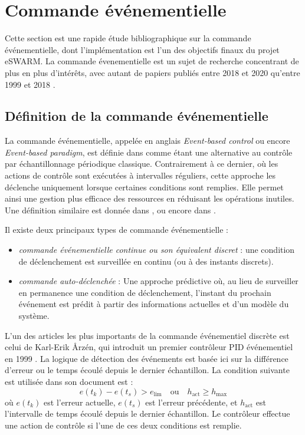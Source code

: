 \newpage

\section{Commande événementielle}
\label{cmd_ev}
Cette section est une rapide étude bibliographique sur la commande événementielle, dont l'implémentation est l'un des objectifs finaux du projet eSWARM. La commande évenementielle est un sujet de recherche concentrant de plus en plus d'intérêts, avec autant de papiers publiés entre 2018 et 2020 qu'entre 1999 et 2018 \cite{aranda-escolastico_event-based_2020}.

\subsection{Définition de la commande événementielle}

La commande événementielle, appelée en anglais \textit{Event-based control} ou encore \textit{Event-based paradigm}, est définie dans \cite{astrom_event_2008} comme étant une alternative au contrôle par échantillonnage périodique classique. Contrairement à ce dernier, où les actions de contrôle sont exécutées à intervalles réguliers, cette approche les déclenche uniquement lorsque certaines conditions sont remplies. Elle permet ainsi une gestion plus efficace des ressources en réduisant les opérations inutiles. Une définition similaire est donnée dans \cite{durand_event-based_2015}, ou encore dans \cite{heemels_introduction_2012}.

\noindent Il existe deux principaux types de commande événementielle \cite{aranda-escolastico_event-based_2020} : 
\begin{itemize}
    \item \textit{commande événementielle continue ou son équivalent discret} : une condition de déclenchement est surveillée en continu (ou à des instants discrets). 
    \item \textit{commande auto-déclenchée} : Une approche prédictive où, au lieu de surveiller en permanence une condition de déclenchement, l'instant du prochain événement est prédit à partir des informations actuelles et d'un modèle du système.
\end{itemize}

L'un des articles les plus importants de la commande événementiel discrète est celui de  Karl-Erik Årzén, qui introduit un premier contrôleur PID événementiel en 1999 \cite{aarzen_simple_1999}. La logique de détection des événements est basée ici sur la différence d'erreur ou le temps écoulé depuis le dernier échantillon. La condition suivante est utilisée dans son document est :
\[
  e(t_k) - e(t_s) > e_{\text{lim}} \quad \text{ou} \quad h_{\text{act}} \geq h_{\text{max}}
\]
où \( e(t_k) \) est l'erreur actuelle, \( e(t_s) \) est l'erreur précédente, et \( h_{\text{act}} \) est l'intervalle de temps écoulé depuis le dernier échantillon. Le contrôleur effectue une action de contrôle si l'une de ces deux conditions est remplie. 

